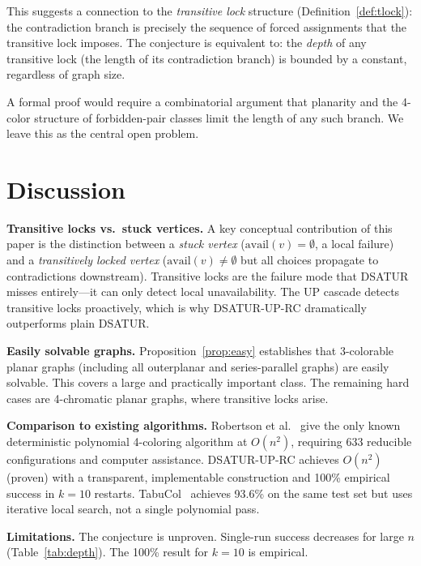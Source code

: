 \documentclass[11pt,twocolumn]{article}
\begin{document}
This suggests a connection to the \emph{transitive lock} structure
(Definition~\ref{def:tlock}): the contradiction branch is precisely
the sequence of forced assignments that the transitive lock imposes.
The conjecture is equivalent to: the \emph{depth} of any transitive lock
(the length of its contradiction branch) is bounded by a constant,
regardless of graph size.

A formal proof would require a combinatorial argument that planarity
and the 4-color structure of forbidden-pair classes limit the length
of any such branch.  We leave this as the central open problem.

\section{Discussion}
\label{sec:discussion}

\textbf{Transitive locks vs.\ stuck vertices.}
A key conceptual contribution of this paper is the distinction between a
\emph{stuck vertex} ($\mathrm{avail}(v)=\emptyset$, a local failure) and
a \emph{transitively locked vertex} ($\mathrm{avail}(v)\ne\emptyset$ but
all choices propagate to contradictions downstream).  Transitive locks
are the failure mode that DSATUR misses entirely---it can only detect
local unavailability.  The UP cascade detects transitive locks proactively,
which is why DSATUR-UP-RC dramatically outperforms plain DSATUR.

\textbf{Easily solvable graphs.}
Proposition~\ref{prop:easy} establishes that 3-colorable planar graphs
(including all outerplanar and series-parallel graphs) are easily solvable.
This covers a large and practically important class.  The remaining
hard cases are 4-chromatic planar graphs, where transitive locks arise.

\textbf{Comparison to existing algorithms.}
Robertson et al.~\cite{robertson1997} give the only known deterministic
polynomial 4-coloring algorithm at $O(n^2)$, requiring 633 reducible
configurations and computer assistance.  DSATUR-UP-RC achieves $O(n^2)$
(proven) with a transparent, implementable construction and 100\%
empirical success in $k=10$ restarts.  TabuCol~\cite{galinier1999}
achieves 93.6\% on the same test set but uses iterative local search,
not a single polynomial pass.

\textbf{Limitations.}
The conjecture is unproven.  Single-run success decreases for large $n$
(Table~\ref{tab:depth}).  The 100\% result for $k=10$ is empirical.
\end{document}
